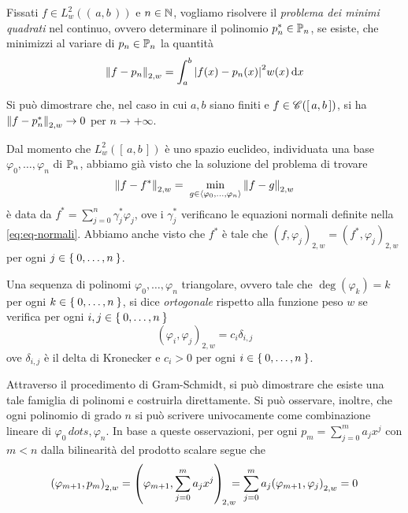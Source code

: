 	Fissati \(f \in L_w^2 ((\, a, b \,))\) e \(n \in \N\), vogliamo risolvere il \emph{problema dei minimi quadrati} nel continuo, ovvero determinare il polinomio \(p_n^* \in \P_n\), se esiste, che minimizzi al variare di \(p_n \in \P_n\) la quantità
	\begin{equation*}
		\norm{f - p_n}_{2, w} = \int_a^b \abs{f (x) - p_n (x)}^2 w (x) \dd{x}
	\end{equation*}
	
	Si può dimostrare che, nel caso in cui \(a, b\) siano finiti e \(f \in \cont ([\, a, b \,])\), si ha \(\norm{f - p_n^*}_{2, w} \to 0\) per \(n \to + \infty\).
	
	Dal momento che \(L_w^2 ([\, a, b \,])\) è uno spazio euclideo, individuata una base \(\varphi_0, \dots, \varphi_n\) di \(\P_n\), abbiamo già visto che la soluzione del problema di trovare
	\begin{equation*}
		\norm{f - f^*}_{2, w} = \; \min_{g \in \Braket{\varphi_0, \dots, \varphi_n}} \norm{f - g}_{2, w}
	\end{equation*}
	è data da \(f^* = \sum_{j = 0}^n \gamma_j^* \varphi_j\), ove i \(\gamma_j^*\) verificano le equazioni normali definite nella \eqref{eq:eq-normali}. Abbiamo anche visto che \(f^*\) è tale che \((f, \varphi_j)_{2, w} = (f^*, \varphi_j)_{2, w}\) per ogni \(j \in \Set{0, \dots, n}\).
	
	\begin{definizione}
		Una sequenza di polinomi \(\varphi_0, \dots, \varphi_n\) triangolare, ovvero tale che \(\deg (\varphi_k) = k\) per ogni \(k \in \Set{0, \dots, n}\), si dice \emph{ortogonale} rispetto alla funzione peso \(w\) se verifica per ogni \(i, j \in \Set{0, \dots, n}\)
		\begin{equation}
			(\varphi_i, \varphi_j)_{2, w} = c_i \delta_{i, j}
		\end{equation}
		ove \(\delta_{i, j}\) è il delta di Kronecker e \(c_i > 0\) per ogni \(i \in \Set{0, \dots, n}\).
	\end{definizione}

	\begin{osservazione}
		Attraverso il procedimento di Gram-Schmidt, si può dimostrare che esiste una tale famiglia di polinomi e costruirla direttamente. Si può osservare, inoltre, che ogni polinomio di grado \(n\) si può scrivere univocamente come combinazione lineare di \(\varphi_0\, dots, \varphi_n\). In base a queste osservazioni, per ogni \(p_m = \sum_{j = 0}^m a_j x^j\) con \(m < n\) dalla bilinearità del prodotto scalare segue che
		\begin{equation}
			\qty(\varphi_{m + 1}, p_m)_{2, w} = \qty(\varphi_{m + 1}, \sum_{j = 0}^m a_j x^j)_{\! 2, w} \hspace{-.7em} = \sum_{j = 0}^m a_j \qty(\varphi_{m + 1}, \varphi_j)_{2, w} = 0
		\end{equation}
	\end{osservazione}
	
